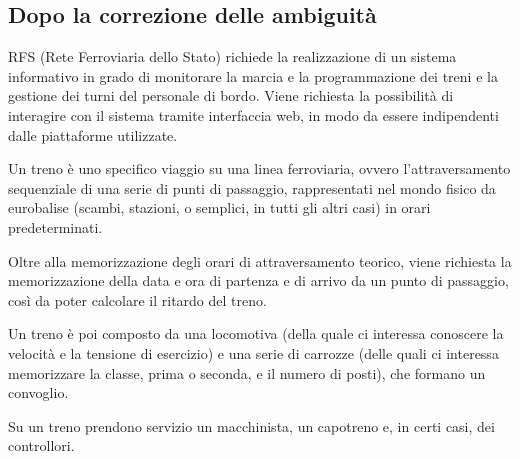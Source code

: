 \documentclass[a4paper,12pt]{report}
\begin{document}
	\subsection{Dopo la correzione delle ambiguità}
	\par RFS (Rete Ferroviaria dello Stato) richiede la realizzazione di un sistema informativo in grado di monitorare la marcia e la programmazione dei treni e la gestione dei turni del personale di bordo. Viene richiesta la possibilità di interagire con il sistema tramite interfaccia web, in modo da essere indipendenti dalle piattaforme utilizzate.
	\par Un treno è uno specifico viaggio su una linea ferroviaria, ovvero l'attraversamento sequenziale di una serie di punti di passaggio, rappresentati nel mondo fisico da eurobalise (scambi, stazioni, o semplici, in tutti gli altri casi) in orari predeterminati.
	\par Oltre alla memorizzazione degli orari di attraversamento teorico, viene richiesta la memorizzazione della data e ora di partenza e di arrivo da un punto di passaggio, così da poter calcolare il ritardo del treno.
	\par Un treno è poi composto da una locomotiva (della quale ci interessa conoscere la velocità e la tensione di esercizio) e una serie di carrozze (delle quali ci interessa memorizzare la classe, prima o seconda, e il numero di posti), che formano un convoglio.
	\par Su un treno prendono servizio un macchinista, un capotreno e, in certi casi, dei controllori.
\end{document}
